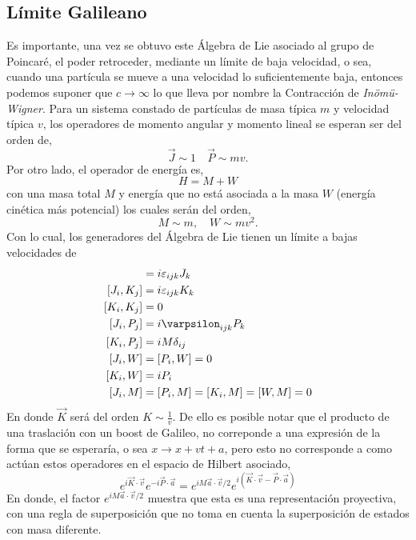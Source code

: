 \documentclass[12pt,letterpaper]{article}
\begin{document}
\subsection{Límite Galileano}
Es importante, una vez se obtuvo este Álgebra de Lie asociado al grupo de Poincaré, el poder retroceder, mediante un límite de baja velocidad, o sea, cuando una partícula se mueve a una velocidad lo suficientemente baja, entonces podemos suponer que $c\to\infty$ lo que lleva por nombre la Contracción de \emph{Inömü-Wigner}. Para un sistema constado de partículas de masa típica $m$ y velocidad típica $v$, los operadores de momento angular y momento lineal se esperan ser del orden de,
\begin{equation}
  \vec{J}\sim 1\quad \vec{P}\sim mv.
 \end{equation}
Por otro lado, el operador de energía es,
\begin{equation}
  H = M + W
 \end{equation}
 con una masa total $M$ y energía que no está asociada a la masa $W$ (energía cinética más potencial) los cuales serán del orden,
 \begin{equation}
   M\sim m,\quad W\sim mv^2.
  \end{equation}
  Con lo cual, los generadores del Álgebra de Lie tienen un límite a bajas velocidades de
  \begin{align}
    [J_i,J_j] & = i\varepsilon_{ijk}J_k \\
    [J_i,K_j] & = i\varepsilon_{ijk} K_k \\
    [K_i,K_j] & = 0 \\
    [J_i,P_j] & = i\varpsilon_{ijk}P_k \\
    [K_i,P_j] & = iM\delta_{ij} \\
    [J_i,W]   & = [P_i,W] = 0 \\
    [K_i,W]   & = iP_i \\
    [J_i,M]   & = [P_i,M] = [K_i,M] = [W,M] = 0
  \end{align}
En donde $\vec{K}$ será del orden $K\sim\frac{1}{v}$. De ello es posible notar que el producto de una traslación con un boost de Galileo, no correponde a una expresión de la forma que se esperaría, o sea $x\to x+vt+a$, pero esto no corresponde a como actúan estos operadores en el espacio de Hilbert asociado,
\begin{equation}
  e^{i\vec{K}\cdot\vec{v}} e^{-i\vec{P}\cdot\vec{a}} = e^{iM\vec{a}\cdot\vec{v}/2} e^{i(\vec{K}\cdot\vec{v}-\vec{P}\cdot\vec{a})}
 \end{equation}
 En donde, el factor $e^{iM\vec{a}\cdot\vec{v}/2}$ muestra que esta es una representación proyectiva, con una regla de superposición que no toma en cuenta la superposición de estados con masa diferente.  
\end{document}
